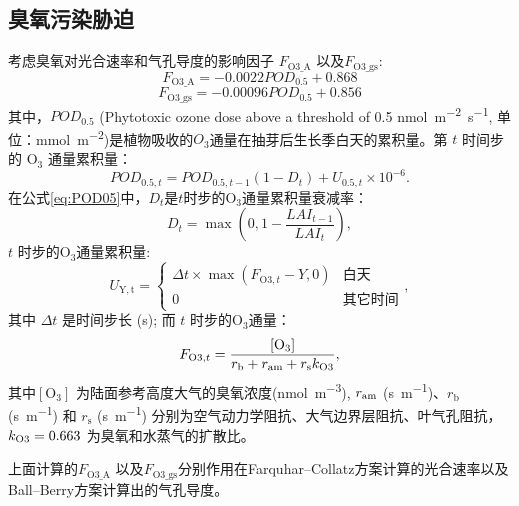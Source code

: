\subsection{臭氧污染胁迫}
考虑臭氧对光合速率和气孔导度的影响因子 $F_{\mathrm{O3\_A}}$ 以及$F_{\mathrm{O3\_{gs}}}$:
\begin{equation}
  F_{\mathrm{O3\_{A}}}=-0.0022 POD_{\mathrm{0.5}}+0.868
\end{equation}
\begin{equation}
  F_{\mathrm{O3\_{gs}}}=-0.00096 POD_{\mathrm{0.5}}+0.856
\end{equation}
其中，$POD_{0.5}$ (Phytotoxic ozone dose above a threshold of 0.5 \unit{nmol.m^{-2}.s^{-1}}, 单位：\unit{mmol.m^{-2}})是植物吸收的$O_3$通量在抽芽后生长季白天的累积量。第 $t$ 时间步的 $\mathrm{O_3}$ 通量累积量：
\begin{equation}\label{eq:POD05}
  POD_{0.5,t}=POD_{0.5,t-1}\left(1-D_t\right)+U_{0.5,t} \times 10^{-6}.
\end{equation}
在公式\eqref{eq:POD05}中，$D_t$是$t$时步的$\mathrm{O_3}$通量累积量衰减率：
\begin{equation}
  D_t = \max\left(0, 1-\frac{LAI_{t-1}}{LAI_t} \right),
\end{equation}
$t$ 时步的$\mathrm{O_3}$通量累积量:
\begin{equation}
  U_{\mathrm{Y,t}}=\begin{cases}
    \Delta t\times\max(F_{{\mathrm {O3}},t}-Y, 0) & \text{白天} \\
    0 & \text{其它时间}
  \end{cases},
\end{equation}
其中 $\Delta t$ 是时间步长 (s); 而 $t$ 时步的$\mathrm{O_3}$通量：
\begin{equation}
  F_{{\mathrm {O3}},t}=\frac{\mathrm{[O_3]}}{r_{\mathrm {b}}  + r_{\mathrm{am}} + r_{\mathrm s}k_{\rm O3}},
\end{equation}
其中$\mathrm{[O_3]}$ 为陆面参考高度大气的臭氧浓度(\unit{nmol.m^{-3}}), $r_{\rm am}$ (\unit{s.m^{-1}})、$r_{\mathrm {b}} $ (\unit{s.m^{-1}}) 和 $r_{\mathrm {s}} $ (\unit{s.m^{-1}}) 分别为空气动力学阻抗、大气边界层阻抗、叶气孔阻抗，$k_{\rm O3}=0.663$ 为臭氧和水蒸气的扩散比。

上面计算的$F_{\mathrm{{O3}\_A}}$ 以及$F_{\mathrm{O3\_{gs}}}$分别作用在Farquhar--Collatz方案计算的光合速率以及Ball--Berry方案计算出的气孔导度。

